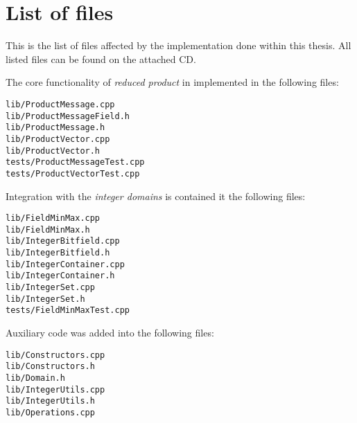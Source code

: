 \documentclass[12pt,oneside]{fithesis2}
\theoremstyle{definition}
\begin{document}



\appendix
\chapter{List of files}

This is the list of files affected by the implementation done within this thesis. All listed files can be found on the attached CD.

The core functionality of \textit{reduced product} in implemented in the following files:

\begin{verbatim}
lib/ProductMessage.cpp
lib/ProductMessageField.h
lib/ProductMessage.h
lib/ProductVector.cpp
lib/ProductVector.h
tests/ProductMessageTest.cpp
tests/ProductVectorTest.cpp
\end{verbatim}

Integration with the \textit{integer domains} is contained it the following  files:

\begin{verbatim}
lib/FieldMinMax.cpp
lib/FieldMinMax.h
lib/IntegerBitfield.cpp
lib/IntegerBitfield.h
lib/IntegerContainer.cpp
lib/IntegerContainer.h
lib/IntegerSet.cpp
lib/IntegerSet.h
tests/FieldMinMaxTest.cpp
\end{verbatim}

Auxiliary code was added into the following files:

\begin{verbatim}
lib/Constructors.cpp
lib/Constructors.h
lib/Domain.h
lib/IntegerUtils.cpp
lib/IntegerUtils.h
lib/Operations.cpp
\end{verbatim}
\end{document}
